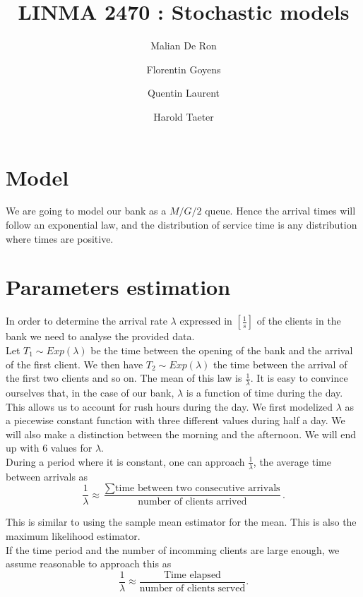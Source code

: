 \documentclass[12pt,a4paper,notitlepage]{report}
\title{LINMA 2470 : Stochastic models}
\author{
  \small Malian De Ron
  \and 
  \small Florentin Goyens
  \and
  \small Quentin Laurent
  \and
  \small Harold Taeter
}
\begin{document}
\maketitle
\section*{Model}
We are going to model our bank as a $M/G/2$ queue. Hence the arrival times will follow an exponential law, and the distribution of service time is any distribution where times are positive.
\section*{Parameters estimation}
In order to determine the arrival rate $\lambda$ expressed in $[\frac{1}{s}]$ of the clients in the bank we need to analyse the provided data.\\

Let $T_{1} \sim Exp(\lambda)$ be the time between the opening of the bank and the arrival of the first client. We then have $T_{2} \sim Exp(\lambda)$ the time between the arrival of the first two clients and so on. The mean of this law is $\frac{1}{\lambda}$.  It is easy to convince ourselves that, in the case of our bank, $\lambda$ is a function of time during the day. This allows us to account for rush hours during the day. We first modelized $\lambda$ as a piecewise constant function with three different values during half a day. We will also make a distinction between the morning and the afternoon. We will end up with $6$ values for $\lambda$.\\
 
 
During a period where it is constant, one can approach $\frac{1}{\lambda}$, the  average time between arrivals as\\
\[
    \frac{1}{\lambda}\approx \frac{\sum \text{time between two consecutive arrivals} }{ \text{number of clients arrived}}.
\]

\vspace{0.5cm}
This is similar to using the sample mean estimator for the mean. This is also the maximum likelihood estimator.\\

If the time period and the number of incomming clients are large enough, we assume reasonable to approach this as\\
\[
    \frac{1}{\lambda}\approx \frac{ \text{Time elapsed} }{ \text{number of clients served}}.
\]
\end{document}
